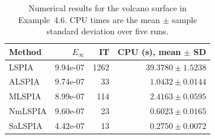 \begin{table}[t]
\centering
\caption{Numerical results for the volcano surface in Example~4.6. CPU times are the mean $\pm$ sample standard deviation over five runs.}
\label{tab:surface_results_cpu_sd_ex46}
\begin{tabular}{lrrr}
\hline
Method & $E_\infty$ & IT & CPU (s), mean $\pm$ SD \\
\hline
LSPIA & 9.94e-07 & 1262 & $39.3780 \pm 1.5238$ \\
ALSPIA & 9.74e-07 & 33 & $1.0432 \pm 0.0144$ \\
MLSPIA & 8.99e-07 & 114 & $2.4163 \pm 0.0595$ \\
NmLSPIA & 9.60e-07 & 23 & $0.6023 \pm 0.0165$ \\
SaLSPIA & 4.42e-07 & 13 & $0.2750 \pm 0.0072$ \\
\hline
\end{tabular}
\end{table}
